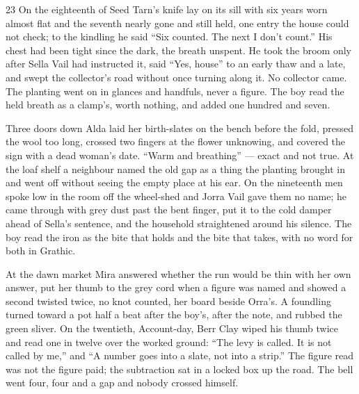 
\scenebreak


\scenebreak


\scenebreak

\CRtailpiece
\begin{CRchronicle}{23}
On the eighteenth of Seed Tarn’s knife lay on its sill with six years worn almost flat and the seventh nearly gone and still held, one entry the house could not check; to the kindling he said “Six counted. The next I don’t count.” His chest had been tight since the dark, the breath unspent. He took the broom only after Sella Vail had instructed it, said “Yes, house” to an early thaw and a late, and swept the collector’s road without once turning along it. No collector came. The planting went on in glances and handfuls, never a figure. The boy read the held breath as a clamp’s, worth nothing, and added one hundred and seven.

Three doors down Alda laid her birth-slates on the bench before the fold, pressed the wool too long, crossed two fingers at the flower unknowing, and covered the sign with a dead woman’s date. “Warm and breathing” — exact and not true. At the loaf shelf a neighbour named the old gap as a thing the planting brought in and went off without seeing the empty place at his ear. On the nineteenth men spoke low in the room off the wheel-shed and Jorra Vail gave them no name; he came through with grey dust past the bent finger, put it to the cold damper ahead of Sella’s sentence, and the household straightened around his silence. The boy read the iron as the bite that holds and the bite that takes, with no word for both in Grathic.

At the dawn market Mira answered whether the run would be thin with her own answer, put her thumb to the grey cord when a figure was named and showed a second twisted twice, no knot counted, her board beside Orra’s. A foundling turned toward a pot half a beat after the boy’s, after the note, and rubbed the green sliver. On the twentieth, Account-day, Berr Clay wiped his thumb twice and read one in twelve over the worked ground: “The levy is called. It is not called by me,” and “A number goes into a slate, not into a strip.” The figure read was not the figure paid; the subtraction sat in a locked box up the road. The bell went four, four and a gap and nobody crossed himself.


\end{CRchronicle}
